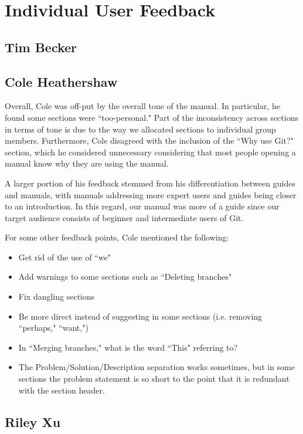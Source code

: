 \documentclass[11pt]{article}
\begin{document}
\section*{Individual User Feedback}

\subsection*{Tim Becker}

\subsection*{Cole Heathershaw}

Overall, Cole was off-put by the overall tone of the manual.  In particular, he found some sections were ``too-personal."  Part of the inconsistency across sections in terms of tone is due to the way we allocated sections to individual group members.  Furthermore, Cole disagreed with the inclusion of the ``Why use Git?" section, which he considered unnecessary considering that most people opening a manual know why they are using the manual.

A larger portion of his feedback stemmed from his differentiation between guides and manuals, with manuals addressing more expert users and guides being closer to an introduction.  In this regard, our manual was more of a guide since our target audience consists of beginner and intermediate users of Git.

For some other feedback points, Cole mentioned the following:
\begin{itemize}
    \item Get rid of the use of ``we"
    \item Add warnings to some sections such as ``Deleting branches"
    \item Fix dangling sections
    \item Be more direct instead of suggesting in some sections (i.e. removing ``perhaps," ``want,")
    \item In ``Merging branches," what is the word ``This" referring to?
    \item The Problem/Solution/Description separation works sometimes, but in some sections the problem statement is so short to the point that it is redundant with the section header.
\end{itemize}
\subsection*{Riley Xu}
\end{document}
